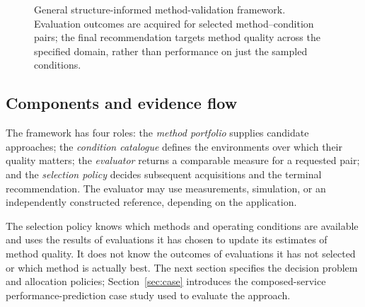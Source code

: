 \documentclass[10pt,a4paper]{article}
\begin{document}
\begin{figure}[t]
\centering
\setlength{\fboxsep}{6pt}
\caption{General structure-informed method-validation framework. Evaluation outcomes are acquired for selected method--condition pairs; the final recommendation targets method quality across the specified domain, rather than performance on just the sampled conditions.}
\label{fig:architecture}
\end{figure}

\subsection{Components and evidence flow}
The framework has four roles: the \emph{method portfolio} supplies candidate approaches; the \emph{condition catalogue} defines the environments over which their quality matters; the \emph{evaluator} returns a comparable measure for a requested pair; and the \emph{selection policy} decides subsequent acquisitions and the terminal recommendation. The evaluator may use measurements, simulation, or an independently constructed reference, depending on the application.

The selection policy knows which methods and operating conditions are available and uses the results of evaluations it has chosen to update its estimates of method quality. It does not know the outcomes of evaluations it has not selected or which method is actually best. The next section specifies the decision problem and allocation policies; Section~\ref{sec:case} introduces the composed-service performance-prediction case study used to evaluate the approach.
\end{document}
